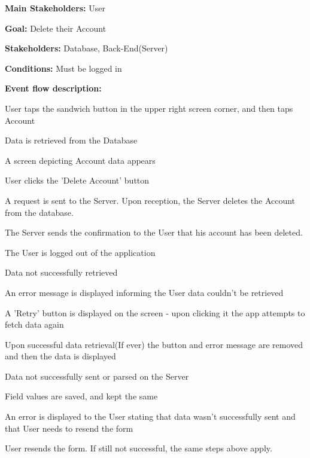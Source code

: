 				\noindent {}
				\begin{packed_item}
					\item \textbf{Main Stakeholders:} User
					\item \textbf{Goal:} Delete their Account
					\item \textbf{Stakeholders:} Database, Back-End(Server)
					\item \textbf{Conditions:} Must be logged in
					\item \textbf{Event flow description: }
					\begin{packed_enum}
						\item User taps the sandwich button in the upper right screen corner, and then taps Account
						\item Data is retrieved from the Database
						\item A screen depicting Account data appears
						\item User clicks the 'Delete Account' button
						\item A request is sent to the Server. Upon reception, the Server deletes the Account from the database.
						\item The Server sends the confirmation to the User that his account has been deleted.
						\item The User is logged out of the application
					\end{packed_enum}
					
					\begin{packed_item}
						\item[2.a] Data not successfully retrieved
						\item[] \begin{packed_enum}
							\item An error message is displayed informing the User data couldn't be retrieved
							\item A 'Retry' button is displayed on the screen - upon clicking it the app attempts to fetch data again
							\item Upon successful data retrieval(If ever) the button and error message are removed and then the data is displayed
						\end{packed_enum}
						
						\item[5.a] Data not successfully sent or parsed on the Server
						\item[] \begin{packed_enum}
							\item Field values are saved, and kept the same
							\item An error is displayed to the User stating that data wasn't successfully sent and that User needs to resend the form
							\item User resends the form. If still not successful, the same steps above apply.
						\end{packed_enum}
						
					\end{packed_item}
					
				\end{packed_item}
			

